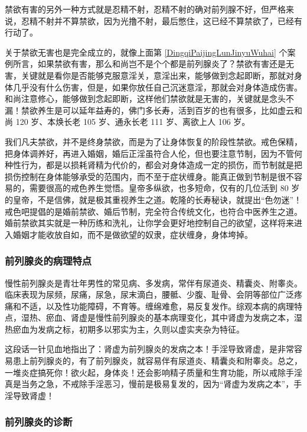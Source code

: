 禁欲有害的另外一种方式就是忍精不射，忍精不射的确对前列腺不好，但严格来说，忍精不射并不算禁欲，因为光撸不射，最后憋住，这已经不算禁欲了，已经有行动了。

关于禁欲无害也是完全成立的，就像上面第 \ref{DingqiPaijingLunJinyuWuhai} 个案例所言，如果禁欲有害，那么和尚岂不是个个都是前列腺炎了？禁欲有害还是无害，关键就是看你是否能够克服意淫关，意淫出来，能够做到念起即断，那就对身体几乎没有什么伤害，但是，如果你放任自己沉迷意淫，那就会对身体造成伤害。和尚注意修心，能够做到念起即断，这样他们禁欲就是无害的，关键就是念头不漏！禁欲养生是可以延年益寿的，佛门多长寿，活到百岁的也有很多，比如虚云和尚 120 岁、本焕长老 105 岁、通永长老 111 岁、离欲上人 106 岁。

我们凡夫禁欲，并不是终身禁欲，而是为了让身体恢复的阶段性禁欲。戒色保精，把身体调养好，再进入婚姻，婚后正淫虽符合人伦，但也要注意节制，因为不管何种性行为，都是以损耗肾精为代价的，都会对身体造成一定的损伤，而节制就是把损伤控制在身体能够承受的范围内，而不至于症状缠身。能真正做到节制是很不容易的，需要很高的戒色养生觉悟。皇帝多纵欲，也多短命，仅有的几位活到 80 岁的皇帝，不是信佛，就是极其重视养生之道。乾隆的长寿秘诀，就提出“色勿迷”！戒色吧提倡的是婚前禁欲、婚后节制，完全符合传统文化，也符合中医养生之道。婚前禁欲其实就是一种历练和洗礼，让你学会更好地控制自己的欲望，这样将来进入婚姻才能收放自如，而不是做欲望的奴隶，症状缠身，身体垮掉。

\subsubsection{前列腺炎的病理特点}

慢性前列腺炎是青壮年男性的常见病、多发病，常伴有尿道炎、精囊炎、附睾炎。临床表现为尿频，尿痛，尿急，尿末滴白，腰骶、少腹、耻骨、会阴等部位广泛疼痛和不适，以及性功能障碍，不育等。缠绵难愈，易反复发作。综观本病的病理特点，湿热、瘀血、肾虚是慢性前列腺炎的基本病理变化，其中肾虚为发病之本，湿热瘀血为发病之标，初期多以邪实为主，久则以虚实夹杂为特征。

这段话一针见血地指出了：肾虚为前列腺炎的发病之本！手淫导致肾虚，是非常容易患上前列腺炎的，有了前列腺炎，就容易伴有尿道炎、精囊炎和附睾炎。总之，一堆炎症搞死你！欲火起，身体炎！还会影响精子质量和生育功能，所以戒除手淫真是当务之急，不戒除手淫恶习，慢前是极易复发的，因为“肾虚为发病之本”，手淫导致肾虚！

\subsubsection{前列腺炎的诊断}

